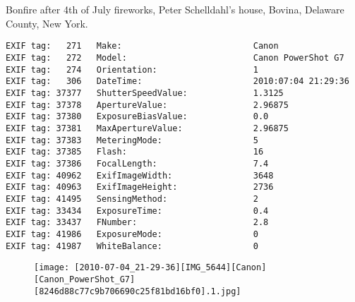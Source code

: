\section{\protect{}}
\noindent Bonfire after 4th of July fireworks, Peter Schelldahl's house, Bovina, Delaware County, New York.
\noindent
\begin{lstlisting}
EXIF tag:   271   Make:                          Canon
EXIF tag:   272   Model:                         Canon PowerShot G7
EXIF tag:   274   Orientation:                   1
EXIF tag:   306   DateTime:                      2010:07:04 21:29:36
EXIF tag: 37377   ShutterSpeedValue:             1.3125
EXIF tag: 37378   ApertureValue:                 2.96875
EXIF tag: 37380   ExposureBiasValue:             0.0
EXIF tag: 37381   MaxApertureValue:              2.96875
EXIF tag: 37383   MeteringMode:                  5
EXIF tag: 37385   Flash:                         16
EXIF tag: 37386   FocalLength:                   7.4
EXIF tag: 40962   ExifImageWidth:                3648
EXIF tag: 40963   ExifImageHeight:               2736
EXIF tag: 41495   SensingMethod:                 2
EXIF tag: 33434   ExposureTime:                  0.4
EXIF tag: 33437   FNumber:                       2.8
EXIF tag: 41986   ExposureMode:                  0
EXIF tag: 41987   WhiteBalance:                  0

\end{lstlisting}
\clearpage
\begin{figure}
\raggedleft
\texttt{[image: [2010-07-04\_21-29-36][IMG\_5644][Canon][Canon\_PowerShot\_G7][8246d88c77c9b706690c25f81bd16bf0].1.jpg]}
\end{figure}


\clearpage
